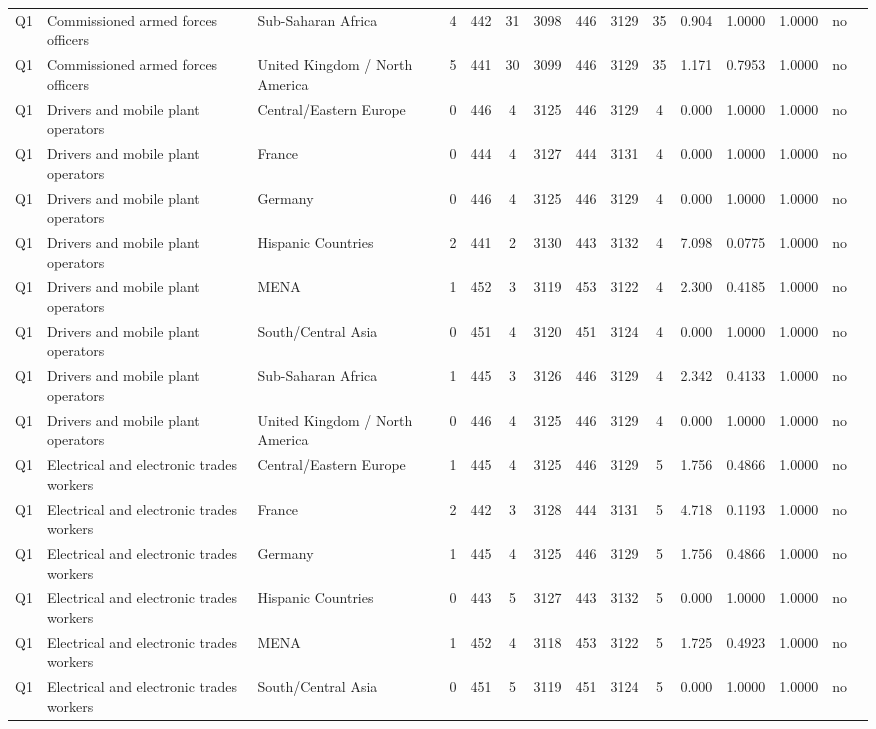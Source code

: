 \begin{longtable}{lllrcccccccccll}
Q1 & Commissioned armed forces officers & Sub-Saharan Africa & 4 & 442 & 31 & 3098 & 446 & 3129 & 35 & 0.904 & 1.0000 & 1.0000 & no \\
Q1 & Commissioned armed forces officers & United Kingdom / North America & 5 & 441 & 30 & 3099 & 446 & 3129 & 35 & 1.171 & 0.7953 & 1.0000 & no \\
Q1 & Drivers and mobile plant operators & Central/Eastern Europe & 0 & 446 & 4 & 3125 & 446 & 3129 & 4 & 0.000 & 1.0000 & 1.0000 & no \\
Q1 & Drivers and mobile plant operators & France & 0 & 444 & 4 & 3127 & 444 & 3131 & 4 & 0.000 & 1.0000 & 1.0000 & no \\
Q1 & Drivers and mobile plant operators & Germany & 0 & 446 & 4 & 3125 & 446 & 3129 & 4 & 0.000 & 1.0000 & 1.0000 & no \\
Q1 & Drivers and mobile plant operators & Hispanic Countries & 2 & 441 & 2 & 3130 & 443 & 3132 & 4 & 7.098 & 0.0775 & 1.0000 & no \\
Q1 & Drivers and mobile plant operators & MENA & 1 & 452 & 3 & 3119 & 453 & 3122 & 4 & 2.300 & 0.4185 & 1.0000 & no \\
Q1 & Drivers and mobile plant operators & South/Central Asia & 0 & 451 & 4 & 3120 & 451 & 3124 & 4 & 0.000 & 1.0000 & 1.0000 & no \\
Q1 & Drivers and mobile plant operators & Sub-Saharan Africa & 1 & 445 & 3 & 3126 & 446 & 3129 & 4 & 2.342 & 0.4133 & 1.0000 & no \\
Q1 & Drivers and mobile plant operators & United Kingdom / North America & 0 & 446 & 4 & 3125 & 446 & 3129 & 4 & 0.000 & 1.0000 & 1.0000 & no \\
Q1 & Electrical and electronic trades workers & Central/Eastern Europe & 1 & 445 & 4 & 3125 & 446 & 3129 & 5 & 1.756 & 0.4866 & 1.0000 & no \\
Q1 & Electrical and electronic trades workers & France & 2 & 442 & 3 & 3128 & 444 & 3131 & 5 & 4.718 & 0.1193 & 1.0000 & no \\
Q1 & Electrical and electronic trades workers & Germany & 1 & 445 & 4 & 3125 & 446 & 3129 & 5 & 1.756 & 0.4866 & 1.0000 & no \\
Q1 & Electrical and electronic trades workers & Hispanic Countries & 0 & 443 & 5 & 3127 & 443 & 3132 & 5 & 0.000 & 1.0000 & 1.0000 & no \\
Q1 & Electrical and electronic trades workers & MENA & 1 & 452 & 4 & 3118 & 453 & 3122 & 5 & 1.725 & 0.4923 & 1.0000 & no \\
Q1 & Electrical and electronic trades workers & South/Central Asia & 0 & 451 & 5 & 3119 & 451 & 3124 & 5 & 0.000 & 1.0000 & 1.0000 & no \\

\end{longtable}
